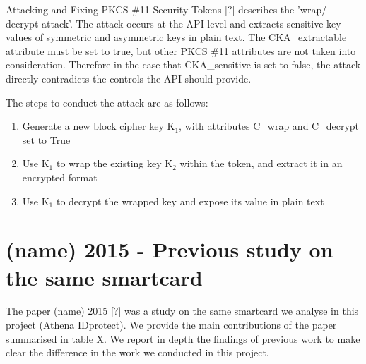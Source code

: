 \documentclass[bsc,frontabs,twoside,singlespacing,parskip,deptreport]{infthesis}     %
\begin{document}
Attacking and Fixing PKCS \#11 Security Tokens [?] describes the 'wrap/ decrypt attack'. The attack occurs at the API level and extracts sensitive key values of symmetric and asymmetric keys in plain text. The CKA\_extractable attribute must be set to true, but other PKCS \#11 attributes are not taken into consideration. Therefore in the case that CKA\_sensitive is set to false, the attack directly contradicts the controls the API should provide.

The steps to conduct the attack are as follows:
\begin{enumerate}
\item Generate a new block cipher key K$_1$, with attributes C\_wrap and C\_decrypt set to True
\item Use K$_1$ to wrap the existing key K$_2$ within the token, and extract it in an encrypted format
\item Use K$_1$ to decrypt the wrapped key and expose its value in plain text
\end{enumerate}

\section{(name) 2015 - Previous study on the same smartcard}

The paper (name) 2015 [?] was a study on the same smartcard we analyse in this project (Athena IDprotect). We provide the main contributions of the paper summarised in table X. We report in depth the findings of previous work to make clear the difference in the work we conducted in this project.
\end{document}
